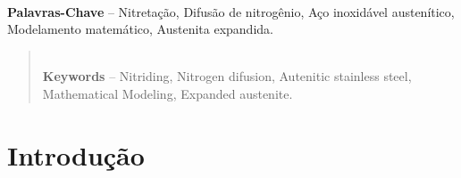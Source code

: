 \documentclass[]{politex}
\newcommand\myworries[1]{\textcolor{red}{#1}}
\begin{document}
\capa
\falsafolhaderosto
\folhaderosto







\begin{agradecimentos}



\end{agradecimentos}




\begin{resumo}

%
\\[3\baselineskip]
%
\textbf{Palavras-Chave} -- Nitretação, Difusão de nitrogênio, Aço inoxidável austenítico, Modelamento matemático, Austenita expandida.
\end{resumo}


\begin{abstract}

%
\\[3\baselineskip]
%
\textbf{Keywords} -- Nitriding, Nitrogen  difusion, Autenitic stainless steel, Mathematical Modeling, Expanded austenite.
\end{abstract}


\listadefiguras
\listadetabelas

\sumario


\chapter{Introdução}

\end{document}

